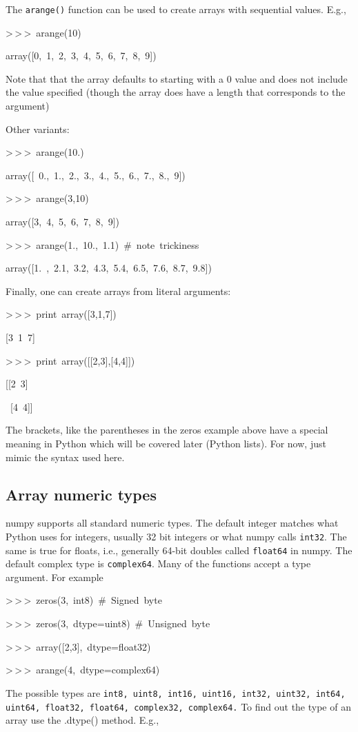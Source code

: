 The \texttt{arange()} function can be used to create arrays with sequential
values. E.g.,

\begin{lyxcode}
>\,{}>\,{}>~arange(10)

array({[}0,~1,~2,~3,~4,~5,~6,~7,~8,~9])
\end{lyxcode}
Note that that the array defaults to starting with a 0 value and does
not include the value specified (though the array does have a length
that corresponds to the argument)

Other variants:

\begin{lyxcode}
>\,{}>\,{}>~arange(10.)

array({[}~0.,~1.,~2.,~3.,~4.,~5.,~6.,~7.,~8.,~9])

>\,{}>\,{}>~arange(3,10)

array({[}3,~4,~5,~6,~7,~8,~9])

>\,{}>\,{}>~arange(1.,~10.,~1.1)~\#~note~trickiness

array({[}1.~,~2.1,~3.2,~4.3,~5.4,~6.5,~7.6,~8.7,~9.8])
\end{lyxcode}
Finally, one can create arrays from literal arguments:

\begin{lyxcode}
>\,{}>\,{}>~print~array({[}3,1,7])

{[}3~1~7]

>\,{}>\,{}>~print~array({[}{[}2,3],{[}4,4]])

{[}{[}2~3]

~{[}4~4]]
\end{lyxcode}
The brackets, like the parentheses in the zeros example above have
a special meaning in Python which will be covered later (Python lists).
For now, just mimic the syntax used here.


\subsection{Array numeric types}

numpy supports all standard numeric types. The default integer
matches what Python uses for integers, usually 32 bit integers or
what numpy calls \texttt{int32}. The same is true for floats, i.e.,
generally 64-bit doubles called \texttt{float64} in numpy. The
default complex type is \texttt{complex64}. Many of the functions
accept a type argument. For example

\begin{lyxcode}
>\,{}>\,{}>~zeros(3,~int8)~\#~Signed~byte

>\,{}>\,{}>~zeros(3,~dtype=uint8)~\#~Unsigned~byte

>\,{}>\,{}>~array({[}2,3],~dtype=float32)

>\,{}>\,{}>~arange(4,~dtype=complex64)
\end{lyxcode}
The possible types are \texttt{int8, uint8, int16, uint16, int32,
uint32, int64, uint64, float32, float64, complex32, complex64.} To
find out the type of an array use the .dtype() method. E.g.,


